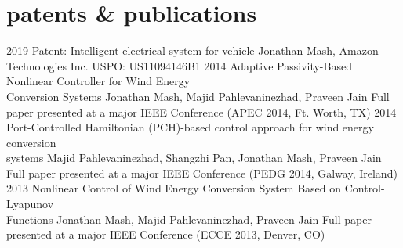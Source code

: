 \section{patents \& publications}

\begin{entrylist}
\entry
{2019}
{Patent: Intelligent electrical system for vehicle}
{{\headingfont Jonathan Mash}, Amazon Technologies Inc.}
{USPO: US11094146B1}
\entry
{2014}
{Adaptive Passivity-Based Nonlinear Controller for Wind Energy \\Conversion Systems}
{{\headingfont Jonathan Mash}, Majid Pahlevaninezhad, Praveen Jain}
{Full paper presented at a major IEEE Conference (APEC 2014, Ft. Worth, TX)}
\entry
{2014}
{Port-Controlled Hamiltonian (PCH)-based control approach for wind energy conversion \\systems}
{Majid Pahlevaninezhad, Shangzhi Pan, {\headingfont Jonathan Mash}, Praveen Jain}
{Full paper presented at a major IEEE Conference (PEDG 2014, Galway, Ireland)}
\entry
{2013}
{Nonlinear Control of Wind Energy Conversion System Based on Control-Lyapunov \\Functions}
{{\headingfont Jonathan Mash}, Majid Pahlevaninezhad, Praveen Jain}
{Full paper presented at a major IEEE Conference (ECCE 2013, Denver, CO)}
\end{entrylist}